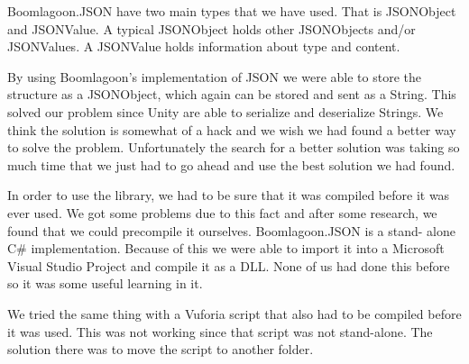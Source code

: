Boomlagoon.{JSON} have two main types that we have used. That is {JSONO}bject
and {JSONV}alue. A typical {JSONO}bject holds other {JSONO}bjects and/or
{JSONV}alues. A {JSONV}alue holds information about type and content.

By using Boomlagoon's implementation of {JSON} we were able to store the
structure as a {JSONO}bject, which again can be stored and sent as a {S}tring.
This solved our problem since {U}nity are able to serialize and deserialize 
{S}trings. We think the solution is somewhat of a hack and we wish we had found
a better way to solve the problem. Unfortunately the search for a better 
solution was taking so much time that we just had to go ahead and use the best
solution we had found.

In order to use the library, we had to be sure that it was compiled before it
was ever used. We got some problems due to this fact and after some research,
we found that we could precompile it ourselves. Boomlagoon.{JSON} is a stand-
alone C\# implementation. Because of this we were able to import it into a
Microsoft Visual Studio Project and compile it as a DLL. None of us had done 
this before so it was some useful learning in it.

We tried the same thing with a Vuforia script that also had to be compiled 
before it was used. This was not working since that script was not stand-alone.
The solution there was to move the script to another folder.
